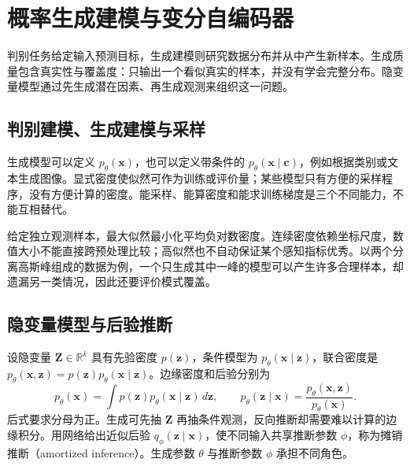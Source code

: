 \setcounter{chapter}{18} %
\chapter{概率生成建模与变分自编码器}
\label{chap:dl-vae}
判别任务给定输入预测目标，生成建模则研究数据分布并从中产生新样本。生成质量包含真实性与覆盖度：只输出一个看似真实的样本，并没有学会完整分布。隐变量模型通过先生成潜在因素、再生成观测来组织这一问题。

\section{判别建模、生成建模与采样}
生成模型可以定义 $p_\theta(\mathbf x)$，也可以定义带条件的 $p_\theta(\mathbf x\mid\mathbf c)$，例如根据类别或文本生成图像。显式密度使似然可作为训练或评价量；某些模型只有方便的采样程序，没有方便计算的密度。能采样、能算密度和能求训练梯度是三个不同能力，不能互相替代。

给定独立观测样本，最大似然最小化平均负对数密度。连续密度依赖坐标尺度，数值大小不能直接跨预处理比较；高似然也不自动保证某个感知指标优秀。以两个分离高斯峰组成的数据为例，一个只生成其中一峰的模型可以产生许多合理样本，却遗漏另一类情况，因此还要评价模式覆盖。

\section{隐变量模型与后验推断}
设隐变量 $\mathbf Z\in\mathbb R^k$ 具有先验密度 $p(\mathbf z)$，条件模型为 $p_\theta(\mathbf x\mid\mathbf z)$，联合密度是 $p_\theta(\mathbf x,\mathbf z)=p(\mathbf z)p_\theta(\mathbf x\mid\mathbf z)$。边缘密度和后验分别为
\[
p_\theta(\mathbf x)=\int p(\mathbf z)p_\theta(\mathbf x\mid\mathbf z)\,d\mathbf z,
\qquad p_\theta(\mathbf z\mid\mathbf x)=\frac{p_\theta(\mathbf x,\mathbf z)}{p_\theta(\mathbf x)}.
\]
后式要求分母为正。生成可先抽 $\mathbf Z$ 再抽条件观测，反向推断却需要难以计算的边缘积分。用网络给出近似后验 $q_\phi(\mathbf z\mid\mathbf x)$，使不同输入共享推断参数 $\phi$，称为摊销推断（amortized inference）。生成参数 $\theta$ 与推断参数 $\phi$ 承担不同角色。

